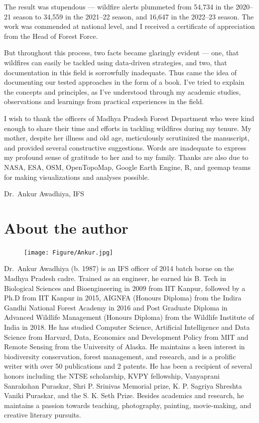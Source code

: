 \documentclass[
  12 pt,
]{Nemilov}
\begin{document}
The result was stupendous --- wildfire alerts plummeted from 54,734 in the 2020--21 season to 34,559 in the 2021--22 season, and 16,647 in the 2022--23 season. The work was commended at national level, and I received a certificate of appreciation from the Head of Forest Force.

But throughout this process, two facts became glaringly evident --- one, that wildfires can easily be tackled using data-driven strategies, and two, that documentation in this field is sorrowfully inadequate. Thus came the idea of documenting our tested approaches in the form of a book. I've tried to explain the concepts and principles, as I've understood through my academic studies, observations and learnings from practical experiences in the field.

I wish to thank the officers of Madhya Pradesh Forest Department who were kind enough to share their time and efforts in tackling wildfires during my tenure. My mother, despite her illness and old age, meticulously scrutinized the manuscript, and provided several constructive suggestions. Words are inadequate to express my profound sense of gratitude to her and to my family. Thanks are also due to NASA, ESA, OSM, OpenTopoMap, Google Earth Engine, R, and geemap teams for making visualizations and analyses possible.

\hfill Dr.~Ankur Awadhiya, IFS

\chapter*{About the author}\label{about-the-author}


\begin{figure}[ht!]
\centering
\texttt{[image: Figure/Ankur.jpg]}
\end{figure}

Dr.~Ankur Awadhiya (b. 1987) is an IFS officer of 2014 batch borne on the Madhya Pradesh cadre. Trained as an engineer, he earned his B. Tech in Biological Sciences and Bioengineering in 2009 from IIT Kanpur, followed by a Ph.D from IIT Kanpur in 2015, AIGNFA (Honours Diploma) from the Indira Gandhi National Forest Academy in 2016 and Post Graduate Diploma in Advanced Wildlife Management (Honours Diploma) from the Wildlife Institute of India in 2018. He has studied Computer Science, Artificial Intelligence and Data Science from Harvard, Data, Economics and Development Policy from MIT and Remote Sensing from the University of Alaska. He maintains a keen interest in biodiversity conservation, forest management, and research, and is a prolific writer with over 50 publications and 2 patents. He has been a recipient of several honors including the NTSE scholarship, KVPY fellowship, Vanyaprani Sanrakshan Puraskar, Shri P. Srinivas Memorial prize, K. P. Sagriya Shreshta Vaniki Puraskar, and the S. K. Seth Prize. Besides academics and research, he maintains a passion towards teaching, photography, painting, movie-making, and creative literary pursuits.
\end{document}
